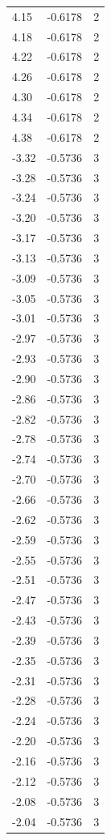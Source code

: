 \begin{longtable}{lrr}
  4.15 & -0.6178 & 2 \\
  4.18 & -0.6178 & 2 \\
  4.22 & -0.6178 & 2 \\
  4.26 & -0.6178 & 2 \\
  4.30 & -0.6178 & 2 \\
  4.34 & -0.6178 & 2 \\
  4.38 & -0.6178 & 2 \\
  -3.32 & -0.5736 & 3 \\
  -3.28 & -0.5736 & 3 \\
  -3.24 & -0.5736 & 3 \\
  -3.20 & -0.5736 & 3 \\
  -3.17 & -0.5736 & 3 \\
  -3.13 & -0.5736 & 3 \\
  -3.09 & -0.5736 & 3 \\
  -3.05 & -0.5736 & 3 \\
  -3.01 & -0.5736 & 3 \\
  -2.97 & -0.5736 & 3 \\
  -2.93 & -0.5736 & 3 \\
  -2.90 & -0.5736 & 3 \\
  -2.86 & -0.5736 & 3 \\
  -2.82 & -0.5736 & 3 \\
  -2.78 & -0.5736 & 3 \\
  -2.74 & -0.5736 & 3 \\
  -2.70 & -0.5736 & 3 \\
  -2.66 & -0.5736 & 3 \\
  -2.62 & -0.5736 & 3 \\
  -2.59 & -0.5736 & 3 \\
  -2.55 & -0.5736 & 3 \\
  -2.51 & -0.5736 & 3 \\
  -2.47 & -0.5736 & 3 \\
  -2.43 & -0.5736 & 3 \\
  -2.39 & -0.5736 & 3 \\
  -2.35 & -0.5736 & 3 \\
  -2.31 & -0.5736 & 3 \\
  -2.28 & -0.5736 & 3 \\
  -2.24 & -0.5736 & 3 \\
  -2.20 & -0.5736 & 3 \\
  -2.16 & -0.5736 & 3 \\
  -2.12 & -0.5736 & 3 \\
  -2.08 & -0.5736 & 3 \\
  -2.04 & -0.5736 & 3 \\

\end{longtable}
